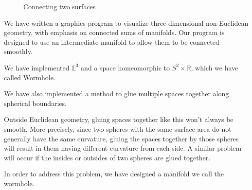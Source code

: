 \begin{figure}[h]
{}
\caption{Connecting two surfaces}
\end{figure}

We have written a graphics program to visualize three-dimensional non-Euclidean geometry, with emphasis on connected sums of manifolds. Our program is designed to use an intermediate manifold to allow them to be connected smoothly.

We have implemented $\mathbb{E}^3$ and a space homeomorphic to $S^2 \times \mathbb{R}$, which we have called Wormhole.

We have also implemented a method to glue multiple spaces together along spherical boundaries.

Outside Euclidean geometry, gluing spaces together like this won't always be smooth. More precisely, since two spheres with the same surface area do not generally have the same curvature, gluing the spaces together by those spheres will result in them having different curvature from each side. A similar problem will occur if the insides or outsides of two spheres are glued together.

In order to address this problem, we have designed a manifold we call the wormhole.

